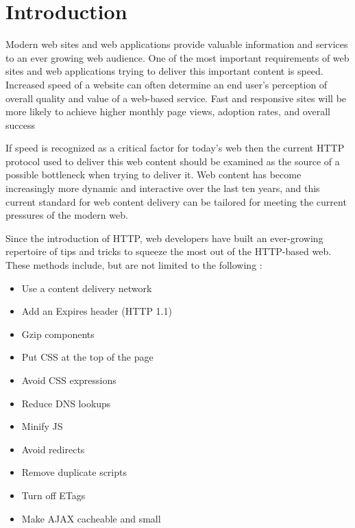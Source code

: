 \documentclass[12pt]{report}
\begin{document}
\tableofcontents
\listoffigures




\chapter{Introduction}

Modern web sites and web applications provide valuable information and services to an ever growing web audience. One of the most important requirements of web sites and web applications trying to deliver this important content is speed. Increased speed of a website can often determine an end user's perception of overall quality and value of a web-based service. Fast and responsive sites will be more likely to achieve higher monthly page views, adoption rates, and overall success

If speed is recognized as a critical factor for today's web then the current HTTP protocol used to deliver this web content should be examined as the source of a possible bottleneck when trying to deliver it. Web content has become increasingly more dynamic and interactive over the last ten years, and this current standard for web content delivery can be tailored for meeting the current pressures of the modern web.

Since the introduction of HTTP, web developers have built an ever-growing repertoire of tips and tricks to squeeze the most out of the HTTP-based web. These methods include, but are not limited to the following \cite{highPerformanceWebsites}:

\begin{itemize}
	\item Use a content delivery network
	\item Add an Expires header (HTTP 1.1)
	\item Gzip components
	\item Put CSS at the top of the page
	\item Avoid CSS expressions
	\item Reduce DNS lookups
	\item Minify JS
	\item Avoid redirects
	\item Remove duplicate scripts
	\item Turn off ETags
	\item Make AJAX cacheable and small
\end{itemize}
\end{document}
